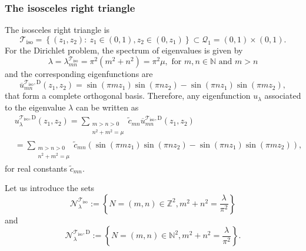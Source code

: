 \documentclass{amsart}
\theoremstyle{definition}
\theoremstyle{remark}
\numberwithin{equation}{section}
\theoremstyle{definition}
\theoremstyle{remark}
\begin{document}
\subsubsection{The isosceles right triangle}
The isosceles right triangle is \begin{equation}
\mathcal{T}_\mathrm{iso}=\left\{(z_1,z_2):\ z_1\in(0,1), z_2\in(0,z_1)\right\}\subset \mathcal{Q}_1=(0,1)\times(0,1). 
\end{equation}  For the Dirichlet problem, the spectrum of eigenvalues is given by
\begin{equation}
	\lambda=	\lambda_{mn}^{\mathcal{T}_\mathrm{iso}}=\pi^2(m^2+n^2 )=\pi^2\mu,\text{ for } m, n \in \mathbb{N}\text{ and }m>n
\end{equation} and the corresponding eigenfunctions are
\begin{equation}
	\overline{u}_{mn}^{\mathcal{T}_\mathrm{iso},\mathrm{D}}(z_1,z_2)=\sin (\pi m z_1) \sin (\pi n z_2)-\sin (\pi n z_1) \sin (\pi m z_2),
\end{equation}
that form a complete orthogonal basis. 
Therefore, any eigenfunction $u_\lambda$ associated to the eigenvalue $\lambda$ can be written as
\begin{equation}
	\begin{aligned}
		&u_\lambda^{\mathcal{T}_\mathrm{iso},\mathrm{D}}(z_1,z_2)=\sum_{\substack{m >n>0 \\ n^2+m^2=\mu}}\tilde{c}_{mn}	\overline{u}_{mn}^{\mathcal{T}_\mathrm{iso},\mathrm{D}}(z_1, z_2)\\&=\sum_{\substack{m >n>0 \\ n^2+m^2=\mu}}\tilde{c}_{mn}(\sin (\pi m z_1) \sin (\pi n z_2)-\sin (\pi n z_1) \sin (\pi m z_2)),
	\end{aligned}
\end{equation}for real constants $\tilde{c}_{mn}$.

Let us introduce the sets \begin{equation}
	\mathcal{N}_\lambda^{\mathcal{T}_\mathrm{iso}}:=\left\{N=(m,n)\in\mathbb{Z}^2, m^2+n^2=\frac{\lambda}{\pi^2}\right\}
\end{equation} and \begin{equation}
	\mathcal{N}_\lambda^{\mathcal{T}_\mathrm{iso},\mathrm{D}}:=\left\{N=(m,n)\in\mathbb{N}^2, m^2+n^2=\frac{\lambda}{\pi^2}\right\}.
\end{equation}
\end{document}

